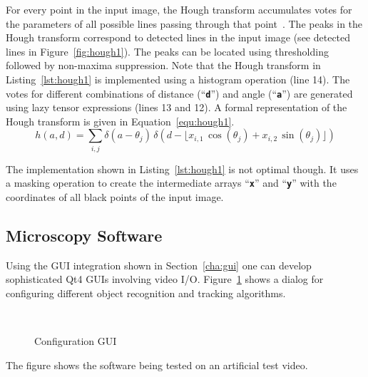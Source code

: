 \documentclass[12pt,a4paper,oneside,openright]{book}
\newcommand{\sct}[1]{Section~\ref{cha:#1}}
\newcommand{\equ}[1]{Equation~\ref{equ:#1}}
\newcommand{\fig}[1]{Figure~\ref{fig:#1}}
\newcommand{\lst}[1]{Listing~\ref{lst:#1}}
\newcommand{\code}[1]{``\texttt{\textbf{\textcolor{codegray}{\small{#1}}}}''}
\begin{document}
\begin{CJK}{UTF8}{}
For every point in the input image, the Hough transform accumulates votes for the parameters of all possible lines passing through that point~\citep{duda1972use}. The peaks in the Hough transform correspond to detected lines in the input image (see detected lines in \fig{hough1}). The peaks can be located using thresholding followed by non-maxima suppression. Note that the Hough transform in \lst{hough1} is implemented using a histogram operation (line 14). The votes for different combinations of distance (\code{d}) and angle (\code{a}) are generated using lazy tensor expressions (lines 13 and 12). A formal representation of the Hough transform is given in \equ{hough1}.
\begin{equation}\label{equ:hough1}
  h(a,d)=\sum_{i,j}\delta(a-\theta_j)\,\delta(d-\lfloor x_{i,1}\,\cos(\theta_j)+x_{i,2}\,\sin(\theta_j)\rfloor)
\end{equation}

The implementation shown in \lst{hough1} is not optimal though. It uses a masking operation to create the intermediate arrays \code{x} and \code{y} with the coordinates of all black points of the input image.

\subsection{Microscopy Software}
Using the \ac{GUI} integration shown in \sct{gui} one can develop sophisticated Qt4 \acp{GUI} involving video \ac{I}/\ac{O}. \fig{nanogui} shows a dialog for configuring different object recognition and tracking algorithms.
\begin{figure}[htbp]
  \begin{center}
    \\
    \caption{Configuration \acs{GUI}\label{fig:nanogui}}
  \end{center}
\end{figure}
The figure shows the software being tested on an artificial test video.


\end{CJK}
\end{document}
